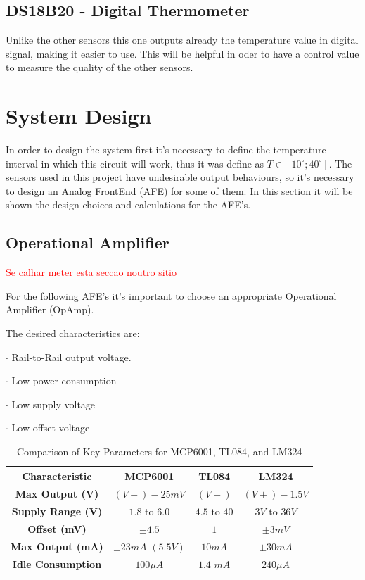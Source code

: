 \documentclass[12pt]{article}
\begin{document}
\subsection{DS18B20 - Digital Thermometer}

    Unlike the other sensors this one outputs already the temperature value in digital signal, making it easier to use. This will be helpful in oder to have a control value to measure the quality of the other sensors.

\newpage
\section{System Design}

    In order to design the system first it's necessary to define the temperature interval in which this circuit will work, thus it was define as $T \in [ 10^{\circ}; 40^{\circ} ]$. 
    The sensors used in this project have undesirable output behaviours, so it's necessary to design an Analog FrontEnd (AFE) for some of them. In this section it will be shown the design choices and calculations for the AFE's.

\subsection{Operational Amplifier}

    \textcolor{red}{Se calhar meter esta seccao noutro sitio}

    For the following AFE's it's important to choose an appropriate Operational Amplifier (OpAmp). 

    The desired characteristics are:

    $\cdot$ Rail-to-Rail output voltage.
    
    $\cdot$ Low power consumption
    
    $\cdot$ Low supply voltage

    $\cdot$ Low offset voltage

    \begin{table}[h]
        \centering
        \begin{tabular}{|c|c|c|c|}
        \hline
        \textbf{Characteristic}     & \textbf{MCP6001}      & \textbf{TL084}   & \textbf{LM324}  \\ \hline
        \textbf{Max Output (V)}     &$(V+)-25mV$            & $(V+)$           & $(V+) - 1.5V$   \\ \hline
        \textbf{Supply Range (V)}   & $1.8$ to $6.0$        & $4.5$ to $40$    & $3V$ to $36V$   \\ \hline
        \textbf{Offset (mV)}        & $\pm 4.5$             & $1$              & $\pm 3 mV$      \\ \hline
        \textbf{Max Output (mA)}    & $\pm 23 mA$ $(5.5V)$  & $10 mA$          & $\pm 30 mA$     \\ \hline
        \textbf{Idle Consumption}   & $100 \mu A $          & $1.4$ $mA$       & $240 \mu A$        \\ \hline
        \end{tabular}
        \caption{Comparison of Key Parameters for MCP6001, TL084, and LM324}
    \end{table}
\end{document}
